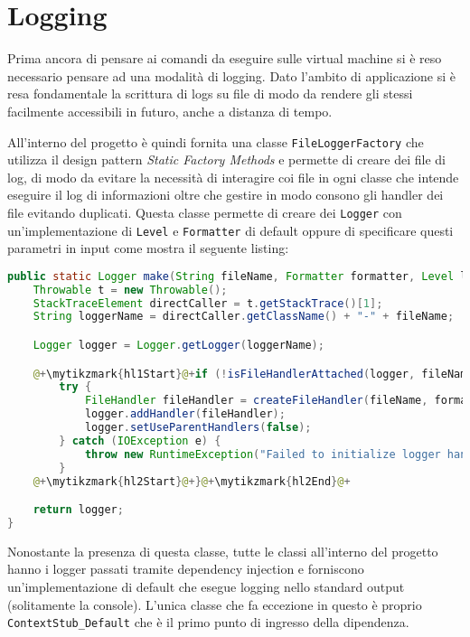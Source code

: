 \section{Logging}
Prima ancora di pensare ai comandi da eseguire sulle virtual machine si è reso necessario pensare ad una modalità di logging. Dato l'ambito di applicazione si è resa fondamentale la scrittura di logs su file di modo da rendere gli stessi facilmente accessibili in futuro, anche a distanza di tempo.\par
All'interno del progetto è quindi fornita una classe \texttt{FileLoggerFactory} che utilizza il design pattern \emph{Static Factory Methods} \cite{effectiveJava} e permette di creare dei file di log, di modo da evitare la necessità di interagire coi file in ogni classe che intende eseguire il log di informazioni oltre che gestire in modo consono gli handler dei file evitando duplicati. Questa classe permette di creare dei \texttt{Logger} con un'implementazione di \texttt{Level} e \texttt{Formatter} di default oppure di specificare questi parametri in input come mostra il seguente listing:
\begin{lstlisting}[language=Java, caption={Metodo make di FileLoggerFactory}, label=code:FileLoggerFactoryMake]
public static Logger make(String fileName, Formatter formatter, Level level) {
    Throwable t = new Throwable();
    StackTraceElement directCaller = t.getStackTrace()[1];
    String loggerName = directCaller.getClassName() + "-" + fileName;

    Logger logger = Logger.getLogger(loggerName);

    @+\mytikzmark{hl1Start}@+if (!isFileHandlerAttached(logger, fileName)) {@+\mytikzmark{hl1End}@+
        try {
            FileHandler fileHandler = createFileHandler(fileName, formatter, level);
            logger.addHandler(fileHandler);
            logger.setUseParentHandlers(false);
        } catch (IOException e) {
            throw new RuntimeException("Failed to initialize logger handler.", e);
        }
    @+\mytikzmark{hl2Start}@+}@+\mytikzmark{hl2End}@+

    return logger;
}
    \end{lstlisting}
Nonostante la presenza di questa classe, tutte le classi all'interno del progetto hanno i logger passati tramite dependency injection e forniscono un'implementazione di default che esegue logging nello standard output (solitamente la console). L'unica classe che fa eccezione in questo è proprio \texttt{ContextStub\_Default} che è il primo punto di ingresso della dipendenza.\\

